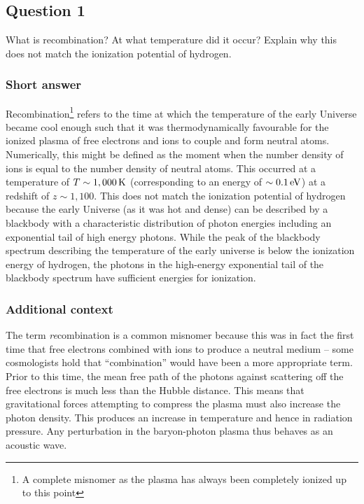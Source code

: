 \documentclass[a4paper,11pt]{article}
\begin{document}
%
%

\newpage
\subsection{Question 1}

What is recombination? At what temperature did it occur? Explain why this does not match the ionization potential of hydrogen.

\subsubsection{Short answer}

Recombination\footnote{A complete misnomer as the plasma has always been completely ionized up to this point} refers to the time at which the temperature of the early Universe became cool enough such that it was thermodynamically favourable for the ionized plasma of free electrons and ions to couple and form neutral atoms. Numerically, this might be defined as the moment when the number density of ions is equal to the number density of neutral atoms. This occurred at a temperature of $T \sim 1,000\,{\rm K}$ (corresponding to an energy of $\sim 0.1\,{\rm eV}$) at a redshift of $z \sim 1,100$. This does not match the ionization potential of hydrogen because the early Universe (as it was hot and dense) can be described by a blackbody with a characteristic distribution of photon energies including an exponential tail of high energy photons. While the peak of the blackbody spectrum describing the temperature of the early universe is below the ionization energy of hydrogen, the photons in the high-energy exponential tail of the blackbody spectrum have sufficient energies for ionization.

\subsubsection{Additional context}

The term \textit{re}combination is a common misnomer because this was in fact the first time that free electrons combined with ions to produce a neutral medium -- some cosmologists hold that ``combination'' would have been a more appropriate term. Prior to this time, the mean free path of the photons against scattering
off the free electrons is much less than the Hubble distance.
This means that gravitational forces attempting to compress the
plasma must also increase the photon density. This produces an
increase in temperature and hence in radiation pressure. Any perturbation in the baryon-photon plasma thus behaves as an acoustic
wave.
\end{document}
